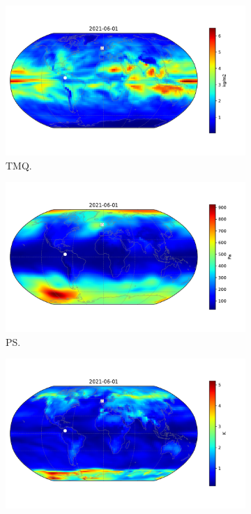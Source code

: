 \begin{figure}[htbp!] 
	\centering
	\begin{subfigure}[b]{0.45\textwidth}
		\includegraphics[width=\textwidth]{TMQ_std}
		\caption{TMQ.}
		\label{fig:std_precip_june}   
	\end{subfigure}             
	\begin{subfigure}[b]{0.45\textwidth}
		\includegraphics[width=\textwidth]{PS_std}
		\caption{PS.}
		\label{fig:std_pressure_june}
	\end{subfigure}             
	\hfill
		\begin{subfigure}[b]{0.45\textwidth}
		\includegraphics[width=\textwidth]{TREFHT_std}

\end{subfigure}
\end{figure}
